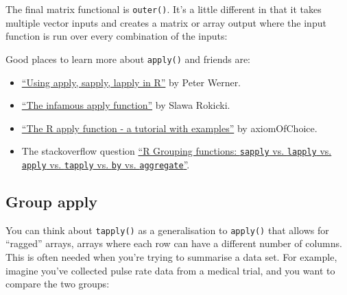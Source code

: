 The final matrix functional is \texttt{outer()}. It's a little different
in that it takes multiple vector inputs and creates a matrix or array
output where the input function is run over every combination of the
inputs: 

\begin{Shaded}
\begin{Highlighting}[]
\NormalTok{(}\NormalTok{:}\NormalTok{, }\NormalTok{:}\NormalTok{, }\NormalTok{)}
\CommentTok{#>      [,1] [,2] [,3] [,4] [,5] [,6] [,7] [,8] [,9] [,10]}
\end{Highlighting}
\end{Shaded}

Good places to learn more about \texttt{apply()} and friends are:

\begin{itemize}
\item
  \href{http://petewerner.blogspot.com/2012/12/using-apply-sapply-lapply-in-r.html}{``Using
  apply, sapply, lapply in R''} by Peter Werner.
\item
  \href{http://rforpublichealth.blogspot.no/2012/09/the-infamous-apply-function.html}{``The
  infamous apply function''} by Slawa Rokicki.
\item
  \href{http://forgetfulfunctor.blogspot.com/2011/07/r-apply-function-tutorial-with-examples.html}{``The
  R apply function - a tutorial with examples''} by axiomOfChoice.
\item
  The stackoverflow question
  \href{http://stackoverflow.com/questions/3505701}{``R Grouping
  functions: \texttt{sapply} vs. \texttt{lapply} vs. \texttt{apply} vs.
  \texttt{tapply} vs. \texttt{by} vs. \texttt{aggregate}''}.
\end{itemize}

\subsection{Group apply}

You can think about \texttt{tapply()} as a generalisation to
\texttt{apply()} that allows for ``ragged'' arrays, arrays where each
row can have a different number of columns. This is often needed when
you're trying to summarise a data set. For example, imagine you've
collected pulse rate data from a medical trial, and you want to compare
the two groups: 

